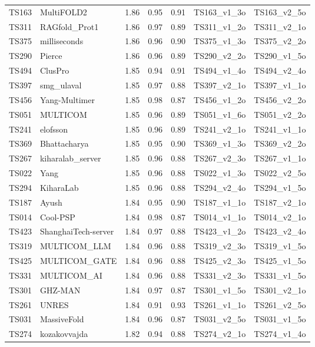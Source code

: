 \begin{table}[ht]
{\begin{tabular}{llrrrll}
TS163 & MultiFOLD2 & 1.86 & 0.95 & 0.91 & TS163\_v1\_3o & TS163\_v2\_5o \\ 
TS311 & RAGfold\_Prot1 & 1.86 & 0.97 & 0.89 & TS311\_v1\_2o & TS311\_v2\_1o \\ 
TS375 & milliseconds & 1.86 & 0.96 & 0.90 & TS375\_v1\_3o & TS375\_v2\_2o \\ 
TS290 & Pierce & 1.86 & 0.96 & 0.89 & TS290\_v2\_2o & TS290\_v1\_5o \\ 
TS494 & ClusPro & 1.85 & 0.94 & 0.91 & TS494\_v1\_4o & TS494\_v2\_4o \\ 
TS397 & smg\_ulaval & 1.85 & 0.97 & 0.88 & TS397\_v2\_1o & TS397\_v1\_1o \\ 
TS456 & Yang-Multimer & 1.85 & 0.98 & 0.87 & TS456\_v1\_2o & TS456\_v2\_2o \\ 
TS051 & MULTICOM & 1.85 & 0.96 & 0.89 & TS051\_v1\_6o & TS051\_v2\_2o \\ 
TS241 & elofsson & 1.85 & 0.96 & 0.89 & TS241\_v2\_1o & TS241\_v1\_1o \\ 
TS369 & Bhattacharya & 1.85 & 0.95 & 0.90 & TS369\_v1\_3o & TS369\_v2\_2o \\ 
TS267 & kiharalab\_server & 1.85 & 0.96 & 0.88 & TS267\_v2\_3o & TS267\_v1\_1o \\ 
TS022 & Yang & 1.85 & 0.96 & 0.88 & TS022\_v1\_3o & TS022\_v2\_5o \\ 
TS294 & KiharaLab & 1.85 & 0.96 & 0.88 & TS294\_v2\_4o & TS294\_v1\_5o \\ 
TS187 & Ayush & 1.84 & 0.95 & 0.90 & TS187\_v1\_1o & TS187\_v2\_1o \\ 
TS014 & Cool-PSP & 1.84 & 0.98 & 0.87 & TS014\_v1\_1o & TS014\_v2\_1o \\ 
TS423 & ShanghaiTech-server & 1.84 & 0.97 & 0.88 & TS423\_v1\_2o & TS423\_v2\_4o \\ 
TS319 & MULTICOM\_LLM & 1.84 & 0.96 & 0.88 & TS319\_v2\_3o & TS319\_v1\_5o \\ 
TS425 & MULTICOM\_GATE & 1.84 & 0.96 & 0.88 & TS425\_v2\_3o & TS425\_v1\_5o \\ 
TS331 & MULTICOM\_AI & 1.84 & 0.96 & 0.88 & TS331\_v2\_3o & TS331\_v1\_5o \\ 
TS301 & GHZ-MAN & 1.84 & 0.97 & 0.87 & TS301\_v1\_5o & TS301\_v2\_1o \\ 
TS261 & UNRES & 1.84 & 0.91 & 0.93 & TS261\_v1\_1o & TS261\_v2\_5o \\ 
TS031 & MassiveFold & 1.84 & 0.96 & 0.87 & TS031\_v2\_5o & TS031\_v1\_5o \\ 
TS274 & kozakovvajda & 1.82 & 0.94 & 0.88 & TS274\_v2\_1o & TS274\_v1\_4o \\ 

\end{tabular}}
\end{table}
